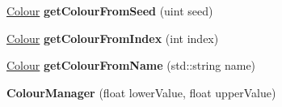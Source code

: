 \begin{DoxyCompactItemize}
\item 
\mbox{\label{classColourManager_a3d0b10403e8e035df59dc74ad9dadb0a}} 
\hyperlink{classColour}{Colour} {\bfseries get\+Colour\+From\+Seed} (uint seed)
\item 
\mbox{\label{classColourManager_a1e97ddf97ab3794495007232466dc3a3}} 
\hyperlink{classColour}{Colour} {\bfseries get\+Colour\+From\+Index} (int index)
\item 
\mbox{\label{classColourManager_af17d269456ff97fd10a7a572b7aac7ec}} 
\hyperlink{classColour}{Colour} {\bfseries get\+Colour\+From\+Name} (std\+::string name)
\item 
\mbox{\label{classColourManager_a52e3d1d62f621de0fe3e0868cdf280e9}} 
{\bfseries Colour\+Manager} (float lower\+Value, float upper\+Value)
\end{DoxyCompactItemize}
